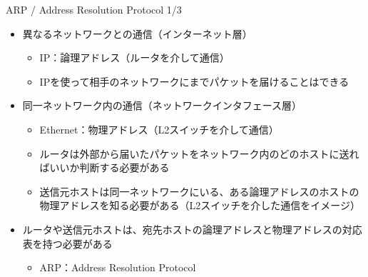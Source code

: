 \documentclass[12pt,aspectratio=169]{beamer}
\begin{document}
\begin{frame}{ARP / Address Resolution Protocol 1/3}

  \begin{itemize}
    \item 異なるネットワークとの通信（インターネット層）
      \begin{itemize}
        \item IP：論理アドレス（ルータを介して通信）
        \item IPを使って相手のネットワークにまでパケットを届けることはできる
      \end{itemize}
    \item 同一ネットワーク内の通信（ネットワークインタフェース層）
      \begin{itemize}
        \item Ethernet：物理アドレス（L2スイッチを介して通信）
        \item ルータは外部から届いたパケットをネットワーク内のどのホストに送ればいいか判断する必要がある
        \item 送信元ホストは同一ネットワークにいる、ある論理アドレスのホストの物理アドレスを知る必要がある（L2スイッチを介した通信をイメージ）
      \end{itemize}
    \item ルータや送信元ホストは、宛先ホストの論理アドレスと物理アドレスの対応表を持つ必要がある
      \begin{itemize}
        \item ARP：Address Resolution Protocol
      \end{itemize}

  \end{itemize}

\end{frame}
\end{document}
